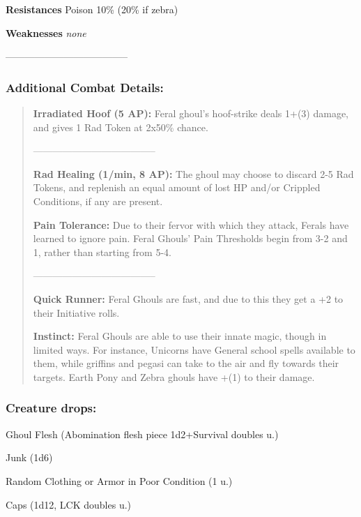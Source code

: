 \documentclass[11pt,a4paper,twocolumn]{book}
\begin{document}
	\noindent
	\textbf{Resistances} Poison 10\% (20\% if zebra)
	
	\noindent
	\textbf{Weaknesses} \emph{none} %
	
	--------------------------------------
	
	\subsubsection*{Additional Combat Details:}
	\begin{verse}
		\textbf{Irradiated Hoof (5 AP):} Feral ghoul's hoof-strike deals 1+(3) damage, and gives 1 Rad Token at 2x50\% chance.
		
		--------------------------------------
		
		\textbf{Rad Healing (1/min, 8 AP):} The ghoul may choose to discard 2-5 Rad Tokens, and replenish an equal amount of lost HP and/or Crippled Conditions, if any are present.
		
		\textbf{Pain Tolerance:} Due to their fervor with which they attack, Ferals have learned to ignore pain. Feral Ghouls' Pain Thresholds begin from 3-2 and 1, rather than starting from 5-4.
		
		--------------------------------------
		
		\textbf{Quick Runner:} Feral Ghouls are fast, and due to this they get a +2 to their Initiative rolls.	
		
		\textbf{Instinct:} Feral Ghouls are able to use their innate magic, though in limited ways. For instance, Unicorns have General school spells available to them, while griffins and pegasi can take to the air and fly towards their targets. Earth Pony and Zebra ghouls have +(1) to their damage. 

	\end{verse}
	
	\subsubsection*{Creature drops:}
	\begin{compactitem}
		\item Ghoul Flesh (Abomination flesh piece 1d2+Survival doubles u.)
		\item Junk (1d6)
		\item Random Clothing or Armor in Poor Condition (1 u.)
		\item Caps (1d12, LCK doubles u.)
	\end{compactitem}
	
\end{document}
